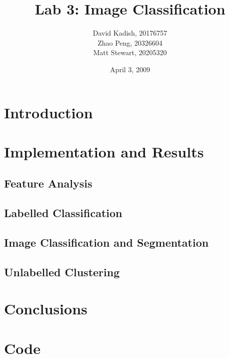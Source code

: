 \documentclass{sydeStyle}
\title{Lab 3: Image Classification}
\author{
    David Kadish, 20176757\\
    Zhao Peng, 20326604\\
    Matt Stewart, 20205320\\
}
\date{April 3, 2009}
\numberwithin{algorithm}{chapter}
\begin{document}

\maketitle

\setcounter{page}{2} %


\chapter{Introduction}


\chapter{Implementation and Results}
\section{Feature Analysis}

\section{Labelled Classification}

\section{Image Classification and Segmentation}

\section{Unlabelled Clustering}



\chapter{Conclusions}


\appendix
\renewcommand{\thechapter}{\Alph{chapter}}

\chapter{Code}
\label{cha:code}

\end{document}
